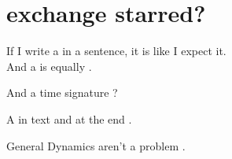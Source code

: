 \documentclass{scrartcl}
\begin{document}
\section*{exchange starred?}

If I write a \flat in a sentence, it is like I expect it.\\
And a \lilyRFZ is equally \lilyRF .

And a time signature  ?

A \lilyRFZ in text and at the end \lilyRFZ*.

General Dynamics  aren't a problem .


	
\end{document}

